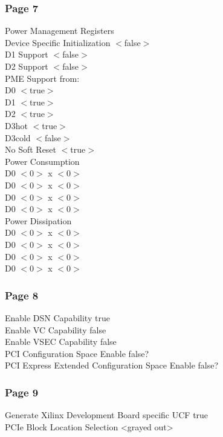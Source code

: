 \subsubsection{Page 7}
Power Management Registers \\
Device Specific Initialization $<$false$>$ \\
D1 Support $<$false$>$ \\
D2 Support $<$false$>$ \\
PME Support from: \\
D0 $<$true$>$ \\
D1 $<$true$>$ \\
D2 $<$true$>$ \\
D3hot $<$true$>$\\
D3cold $<$false$>$\\
No Soft Reset $<$true$>$  \\


Power Consumption \\
D0 $<$0$>$ x $<$0$>$ \\
D0 $<$0$>$ x $<$0$>$ \\
D0 $<$0$>$ x $<$0$>$ \\
D0 $<$0$>$ x $<$0$>$  \\
Power Dissipation \\
D0 $<$0$>$ x $<$0$>$ \\
D0 $<$0$>$ x $<$0$>$ \\
D0 $<$0$>$ x $<$0$>$ \\
D0 $<$0$>$ x $<$0$>$ \\

\subsubsection{Page 8}
Enable DSN Capability true \\
Enable VC Capability false \\
Enable VSEC Capability false \\
PCI Configuration Space Enable false? \\
PCI Express Extended Configuration Space Enable false?  \\

\subsubsection{Page 9}
Generate Xilinx Development Board specific UCF true \\
PCIe Block Location Selection <grayed out>  \\

